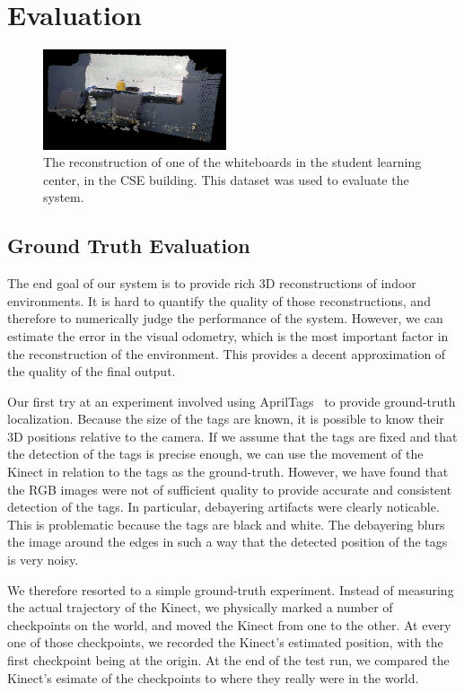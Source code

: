 \documentclass[letterpaper, 10pt, conference]{ieeeconf}
\begin{document}
\section{Evaluation}
\begin{figure}[t]
\centering
\includegraphics[width=0.48\textwidth]{figures/cropped_gt_slc.png}
\caption{The reconstruction of one of the whiteboards in the student learning center,
in the CSE building. This dataset was used to evaluate the system.}
\label{fig:gt-slc}
\end{figure}

\subsection{Ground Truth Evaluation}
The end goal of our system is to provide rich 3D reconstructions of indoor environments.
It is hard to quantify the quality of those reconstructions, and therefore to numerically
judge the performance of the system. However, we can estimate the error in the visual odometry,
which is the most important factor in the reconstruction of the environment. This provides
a decent approximation of the quality of the final output.

Our first try at an experiment involved using AprilTags~\cite{olson2011tags} to
provide ground-truth localization. Because the size of the tags are known, it is
possible to know their 3D positions relative to the camera. If we assume that the tags are fixed and that
the detection of the tags is precise enough, we can use the movement of the
Kinect in relation to the tags as the ground-truth. However, we have found that
the RGB images were not of sufficient quality to provide accurate and consistent
detection of the tags. In particular, debayering artifacts were clearly noticable.
This is problematic because the tags are black and white. The debayering blurs the
image around the edges in such a way that the detected position of the tags is very noisy.

We therefore resorted to a simple ground-truth experiment. Instead of measuring the actual trajectory of
the Kinect, we physically marked a number of checkpoints on the world,
and moved the Kinect from one to the other. At every one of those checkpoints, we recorded the
Kinect's estimated position, with the first checkpoint being at the origin. At the end of the
test run, we compared the Kinect's esimate of the checkpoints to where they really were in the
world.
\end{document}
